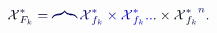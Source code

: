\documentclass[12pt]{article}
\begin{document}
\makeatletter
\renewcommand*{\@textcolor}[3]{%
  \protect\leavevmode
  \begingroup
    \color#1{#2}#3%
  \endgroup
}
\makeatother
\begin{displaymath}
\mathcal { \mathcolor[RGB]{0,0,15}{X} } _ { \mathcolor[RGB]{0,0,30}{F} _ { \mathcolor[RGB]{0,0,45}{k} } } ^ { \mathcolor[RGB]{0,0,60}{*} } \mathcolor[RGB]{0,0,75}{=} \mathcolor[RGB]{0,0,90}{\overbrace} { \mathcal { \mathcolor[RGB]{0,0,105}{X} } _ { \mathcolor[RGB]{0,0,120}{f} _ { \mathcolor[RGB]{0,0,135}{k} } } ^ { \mathcolor[RGB]{0,0,150}{*} } \mathcolor[RGB]{0,0,165}{\times} \mathcal { \mathcolor[RGB]{0,0,180}{X} } _ { \mathcolor[RGB]{0,0,195}{f} _ { \mathcolor[RGB]{0,0,210}{k} } } ^ { \mathcolor[RGB]{0,0,225}{*} } \mathcolor[RGB]{0,0,240}{.} \mathcolor[RGB]{0,0,255}{.} \mathcolor[RGB]{0,15,0}{.} \mathcolor[RGB]{0,15,15}{\times} \mathcal { \mathcolor[RGB]{0,15,30}{X} } _ { \mathcolor[RGB]{0,15,45}{f} _ { \mathcolor[RGB]{0,15,60}{k} } } ^ { \mathcolor[RGB]{0,15,75}{*} } } ^ { \mathcolor[RGB]{0,15,90}{n} } \mathcolor[RGB]{0,15,105}{.}
\end{displaymath}
\end{document}
